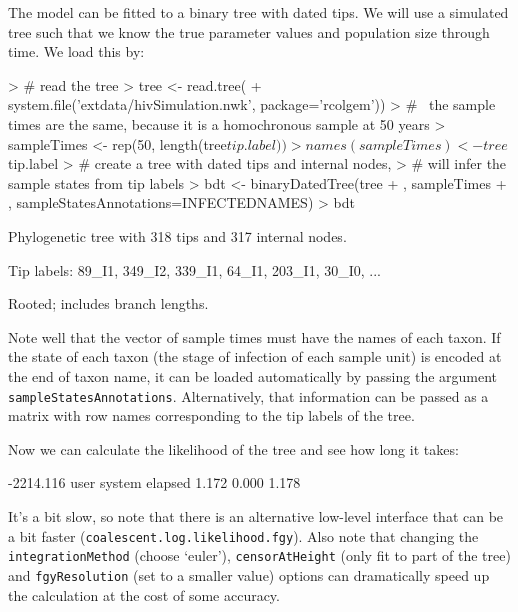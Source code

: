 \documentclass{article}
\begin{document}
The model can be fitted to a binary tree with dated tips. 
We will use a simulated tree such that we know the true parameter values and population size through time. 
We load this by: 
\begin{Schunk}
\begin{Sinput}
> # read the tree
> tree <- read.tree(
+    system.file('extdata/hivSimulation.nwk', package='rcolgem'))
> #~ the sample times are the same, because it is a homochronous sample at 50 years
> sampleTimes <- rep(50, length(tree$tip.label))
> names(sampleTimes) <- tree$tip.label
> # create a tree with dated tips and internal nodes, 
> # will infer the sample states from tip labels
> bdt <- binaryDatedTree(tree
+   , sampleTimes
+   , sampleStatesAnnotations=INFECTEDNAMES)
> bdt
\end{Sinput}
\begin{Soutput}
Phylogenetic tree with 318 tips and 317 internal nodes.

Tip labels:
	89_I1, 349_I2, 339_I1, 64_I1, 203_I1, 30_I0, ...

Rooted; includes branch lengths.
\end{Soutput}
\end{Schunk}
Note well that the vector of sample times must have the names of each taxon. 
If the state of each taxon (the stage of infection of each sample unit) is encoded at the end of taxon name, it can be loaded automatically by passing the argument \texttt{sampleStatesAnnotations}.  
Alternatively, that information can be passed as a matrix with row names corresponding to the tip labels of the tree. 

Now we can calculate the likelihood of the tree and see how long it takes:
\begin{Schunk}
\begin{Soutput}
[1] -2214.116
   user  system elapsed 
  1.172   0.000   1.178 
\end{Soutput}
\end{Schunk}
It's a bit slow, so note that there is an alternative low-level interface that can be a bit faster (\texttt{coalescent.log.likelihood.fgy}). Also note that changing the \texttt{integrationMethod} (choose `euler'), \texttt{censorAtHeight} (only fit to part of the tree) and \texttt{fgyResolution} (set to a smaller value) options can dramatically speed up the calculation at the cost of some accuracy. 
\end{document}

